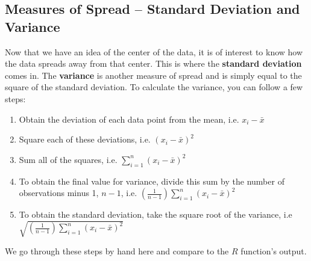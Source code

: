 \documentclass[11pt]{article}\usepackage[]{graphicx}\usepackage[]{color}
\begin{document}
\subsection{Measures of Spread -- Standard Deviation and Variance}
Now that we have an idea of the center of the data, it is of interest to know how the data spreads away from that center.  This is where the \textbf{standard deviation} comes in.  The \textbf{variance} is another measure of spread and is simply equal to the square of the standard deviation.
To calculate the variance, you can follow a few steps:
\begin{enumerate}
\item Obtain the deviation of each data point from the mean, i.e. $x_i - \bar{x}$
\item Square each of these deviations, i.e. $(x_i - \bar{x})^2$
\item Sum all of the squares, i.e. $\sum_{i=1}^n (x_i - \bar{x})^2$
\item To obtain the final value for variance, divide this sum by the number of observations minus 1, $n-1$, i.e. $(\frac{1}{n-1})\sum_{i=1}^n (x_i - \bar{x})^2$
\item To obtain the standard deviation, take the square root of the variance, i.e $\sqrt{(\frac{1}{n-1})\sum_{i=1}^n (x_i - \bar{x})^2}$
\end{enumerate}
We go through these steps by hand here and compare to the $R$ function's output.
\end{document}
